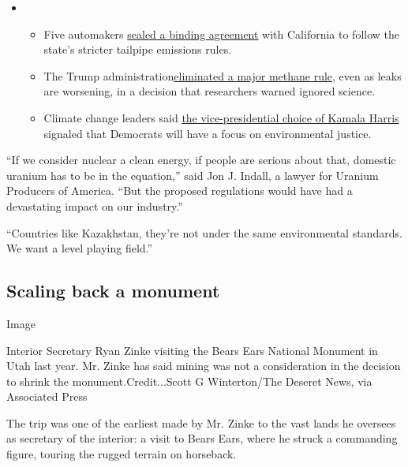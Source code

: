 \begin{itemize}
\item
  \begin{itemize}
  \tightlist
  \item
    Five automakers
    \href{https://www.nytimes3xbfgragh.onion/2020/08/17/climate/california-automakers-pollution.html?action=click\&pgtype=Article\&state=default\&region=MAIN_CONTENT_1\&context=storylines_keepup}{sealed
    a binding agreement} with California to follow the state's stricter
    tailpipe emissions rules.
  \item
    The Trump
    administration\href{https://www.nytimes3xbfgragh.onion/2020/08/13/climate/trump-methane.html?action=click\&pgtype=Article\&state=default\&region=MAIN_CONTENT_1\&context=storylines_keepup}{eliminated
    a major methane rule}, even as leaks are worsening, in a decision
    that researchers warned ignored science.
  \item
    Climate change leaders said
    \href{https://www.nytimes3xbfgragh.onion/2020/08/12/climate/kamala-harris-environmental-justice.html?action=click\&pgtype=Article\&state=default\&region=MAIN_CONTENT_1\&context=storylines_keepup}{the
    vice-presidential choice of Kamala Harris} signaled that Democrats
    will have a focus on environmental justice.
  \end{itemize}
\end{itemize}

``If we consider nuclear a clean energy, if people are serious about
that, domestic uranium has to be in the equation,'' said Jon J. Indall,
a lawyer for Uranium Producers of America. ``But the proposed
regulations would have had a devastating impact on our industry.''

``Countries like Kazakhstan, they're not under the same environmental
standards. We want a level playing field.''

\hypertarget{scaling-back-a-monument}{%
\subsection{Scaling back a monument}\label{scaling-back-a-monument}}

Image

Interior Secretary Ryan Zinke visiting the Bears Ears National Monument
in Utah last year. Mr. Zinke has said mining was not a consideration in
the decision to shrink the monument.Credit...Scott G Winterton/The
Deseret News, via Associated Press

The trip was one of the earliest made by Mr. Zinke to the vast lands he
oversees as secretary of the interior: a visit to Bears Ears, where he
struck a commanding figure, touring the rugged terrain on horseback.

